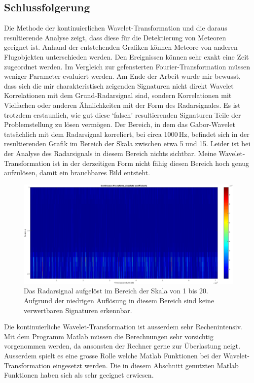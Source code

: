 \begin{refsection}
\section{Schlussfolgerung}

Die Methode der kontinuierlichen Wavelet-Transformation und die daraus resultierende Analyse zeigt, dass diese für die Detektierung von Meteoren geeignet ist.
Anhand der entstehenden Grafiken können Meteore von anderen Flugobjekten unterschieden werden.
Den Ereignissen können sehr exakt eine Zeit zugeordnet werden.
Im Vergleich zur gefensterten Fourier-Transformation müssen weniger Parameter evaluiert werden.
Am Ende der Arbeit wurde mir bewusst, dass sich die mir charakteristisch zeigenden Signaturen nicht direkt Wavelet Korrelationen mit dem Grund-Radarsignal sind, sondern Korrelationen mit Vielfachen oder anderen Ähnlichkeiten mit der Form des Radarsignales.
Es ist trotzdem erstaunlich, wie gut diese `falsch' resultierenden Signaturen Teile der Problemstellung zu lösen vermögen.
Der Bereich, in dem das Gabor-Wavelet tatsächlich mit dem Radarsignal korreliert, bei circa 1000\,Hz, befindet sich in der resultierenden Grafik im Bereich der Skala zwischen etwa 5 und 15.
Leider ist bei der Analyse des Radarsignals in diesem Bereich nichts sichtbar.
Meine Wavelet-Transformation ist in der derzeitigen Form nicht fähig diesen Bereich hoch genug aufzulösen, damit ein brauchbares Bild entsteht.
\begin{figure}
	\centering
	\includegraphics[width=\linewidth]{papers/meteor/images/anomalie/cwt_signal_scale1to20-clipped.png}
	\caption{Das Radarsignal aufgelöst im Bereich der Skala von 1 bis 20. 
	Aufgrund der niedrigen Auflösung in diesem Bereich sind keine verwertbaren Signaturen erkennbar.}
	\label{fig:signalmitwscaloscale1to20}
\end{figure}

Die kontinuierliche Wavelet-Transformation ist ausserdem sehr Rechenintensiv. 
Mit dem Programm Matlab müssen die Berechnungen sehr vorsichtig vorgenommen werden, da ansonsten der Rechner gerne zur Überlastung neigt.
Ausserdem spielt es eine grosse Rolle welche Matlab Funktionen bei der Wavelet-Transformation eingesetzt werden.
Die in diesem Abschnitt genutzten Matlab Funktionen haben sich als sehr geeignet erwiesen.  

\printbibliography[heading=subbibliography]
\end{refsection}
